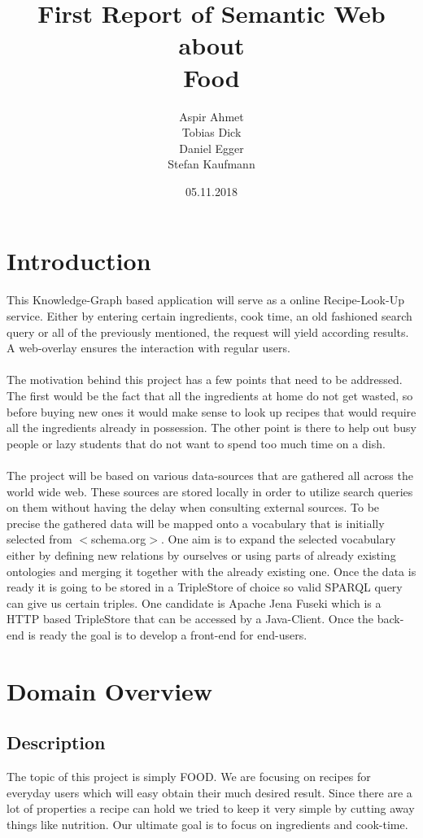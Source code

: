 \documentclass{article}
\title{ First Report of Semantic Web about \\ \Huge \textbf{Food}}
\author{Aspir Ahmet \\ Tobias Dick \\ Daniel Egger \\Stefan Kaufmann}
\date{05.11.2018}
\begin{document}
\thispagestyle{empty}
\clearpage
\maketitle
\thispagestyle{empty}
\thispagestyle{empty}
\newpage
\clearpage
\tableofcontents 
\thispagestyle{empty}
\newpage
\pagebreak
{}
	
\section{Introduction}
This Knowledge-Graph based application will serve as a online Recipe-Look-Up service. Either by entering certain ingredients, cook time, an old fashioned search query or all of the previously mentioned, the request will yield according results. A web-overlay ensures the interaction with regular users. \\ \\
The motivation behind this project has a few points that need to be addressed. The first would be the fact that all the ingredients at home do not get wasted, so before buying new ones it would make sense to look up recipes that would require all the ingredients already in possession. 
The other point is there to help out busy people or lazy students that do not want to spend too much time on a dish. \\ \\
The project will be based on various data-sources that are gathered all across the world wide web. These sources are stored locally in order to utilize search queries on them without having the delay  when consulting external sources. To be precise the gathered data will be mapped onto a vocabulary that is initially selected from $<$schema.org$>$. One aim is to expand the selected vocabulary either by defining new relations by ourselves or using parts of already existing ontologies and merging it together with the already existing one. Once the data is ready it is going to be stored in a TripleStore of choice so valid SPARQL query can give us certain triples. One candidate is Apache Jena Fuseki which is a HTTP based TripleStore that can be accessed by a Java-Client.
Once the back-end is ready the goal is to develop a front-end for end-users.
	
\section{Domain Overview}
\subsection{Description}
The topic of this project is simply FOOD. We are focusing on recipes for everyday users which will easy obtain their much desired result. Since there are a lot of properties a recipe can hold we tried to keep it very simple by cutting away things like nutrition. Our ultimate goal is to focus on ingredients and cook-time.
\end{document}
